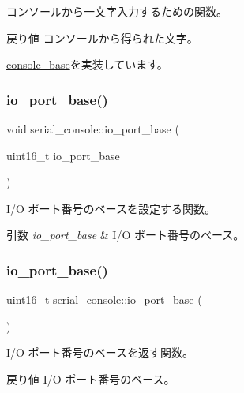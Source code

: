 コンソールから一文字入力するための関数。 \begin{DoxyReturn}{戻り値}
コンソールから得られた文字。 
\end{DoxyReturn}


\hyperlink{classconsole__base_ab06fe008a39c09c60e427946f486833e}{console\+\_\+base}を実装しています。

\hypertarget{classserial__console_a7997c59282c7c6646453496b32b62f71}{}\label{classserial__console_a7997c59282c7c6646453496b32b62f71} 
\subsubsection{\texorpdfstring{io\+\_\+port\+\_\+base()}{io\_port\_base()}\hspace{0.1cm}{\footnotesize\ttfamily [1/2]}}
{\footnotesize\ttfamily void serial\+\_\+console\+::io\+\_\+port\+\_\+base (\begin{DoxyParamCaption}\item[{uint16\+\_\+t}]{io\+\_\+port\+\_\+base }\end{DoxyParamCaption})}

I/O ポート番号のベースを設定する関数。 
\begin{DoxyParams}{引数}
{\em io\+\_\+port\+\_\+base} & I/O ポート番号のベース。 \\
\hline
\end{DoxyParams}
\hypertarget{classserial__console_a8f5ba5b33eeb7b126c23f48300949ae6}{}\label{classserial__console_a8f5ba5b33eeb7b126c23f48300949ae6} 
\subsubsection{\texorpdfstring{io\+\_\+port\+\_\+base()}{io\_port\_base()}\hspace{0.1cm}{\footnotesize\ttfamily [2/2]}}
{\footnotesize\ttfamily uint16\+\_\+t serial\+\_\+console\+::io\+\_\+port\+\_\+base (\begin{DoxyParamCaption}{ }\end{DoxyParamCaption})}

I/O ポート番号のベースを返す関数。 \begin{DoxyReturn}{戻り値}
I/O ポート番号のベース。 
\end{DoxyReturn}
\hypertarget{classserial__console_a649deaac8973408643de56bbe1438890}{}\label{classserial__console_a649deaac8973408643de56bbe1438890} 
